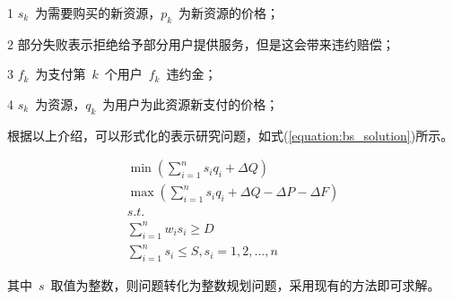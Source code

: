 \begin{table}[htbp]
\begin{threeparttable}
\begin{tabular}{lllllll}
        \end{tabular}%
        \begin{tablenotes}
            \item[1] $s_k$~为需要购买的新资源，$p_k$~为新资源的价格；
            \item[2] 部分失败表示拒绝给予部分用户提供服务，但是这会带来违约赔偿；
            \item[3] $f_k$~为支付第~$k$~个用户~$f_k$~违约金；
            \item[4] $s_k$~为资源，$q_k$~为用户为此资源新支付的价格；
        \end{tablenotes}
    \end{threeparttable}
\end{table}%

根据以上介绍，可以形式化的表示研究问题，如式(\ref{equation:bs_solution})所示。

\begin{equation}\label{equation:bs_solution}
\begin{array}{l}
\min (\sum\limits_{i = 1}^n {{s_i}} {q_i} + \Delta Q)\\
\max (\sum\limits_{i = 1}^n {{s_i}} {q_i} + \Delta Q - \Delta P - \Delta F)\\
s.t.\\
\sum\limits_{i = 1}^n {{w_i}{s_i} \ge D} \\
\sum\limits_{i = 1}^n {{s_i} \le S} ,{s_i} = 1,2,...,n
\end{array}
\end{equation}
\vspace{\wordsep}

其中~$s$~取值为整数，则问题转化为整数规划问题，采用现有的方法即可求解。

%

%
%
%
%


